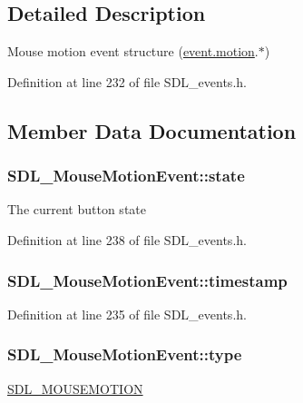 \subsection{Detailed Description}
Mouse motion event structure (\hyperlink{union_s_d_l___event_ac3c89e190faacbe84280cd539453bab6}{event.\-motion}.$\ast$) 

Definition at line 232 of file S\-D\-L\-\_\-events.\-h.



\subsection{Member Data Documentation}
\hypertarget{struct_s_d_l___mouse_motion_event_a3f6e9bad9d959b824881ba09e05b7024}{
\subsubsection[{state}]{ S\-D\-L\-\_\-\-Mouse\-Motion\-Event\-::state}}\label{struct_s_d_l___mouse_motion_event_a3f6e9bad9d959b824881ba09e05b7024}
The current button state 

Definition at line 238 of file S\-D\-L\-\_\-events.\-h.

\hypertarget{struct_s_d_l___mouse_motion_event_af530bc0ef327ea6d497c5b1da119841c}{
\subsubsection[{timestamp}]{ S\-D\-L\-\_\-\-Mouse\-Motion\-Event\-::timestamp}}\label{struct_s_d_l___mouse_motion_event_af530bc0ef327ea6d497c5b1da119841c}


Definition at line 235 of file S\-D\-L\-\_\-events.\-h.

\hypertarget{struct_s_d_l___mouse_motion_event_a431dd28cd6db6a7335cf633dbeb80cfb}{
\subsubsection[{type}]{ S\-D\-L\-\_\-\-Mouse\-Motion\-Event\-::type}}\label{struct_s_d_l___mouse_motion_event_a431dd28cd6db6a7335cf633dbeb80cfb}
\hyperlink{_s_d_l__events_8h_a3b589e89be6b35c02e0dd34a55f3fccaa04c436ef80fef38fb77a89e0e9124c30}{S\-D\-L\-\_\-\-M\-O\-U\-S\-E\-M\-O\-T\-I\-O\-N} 

